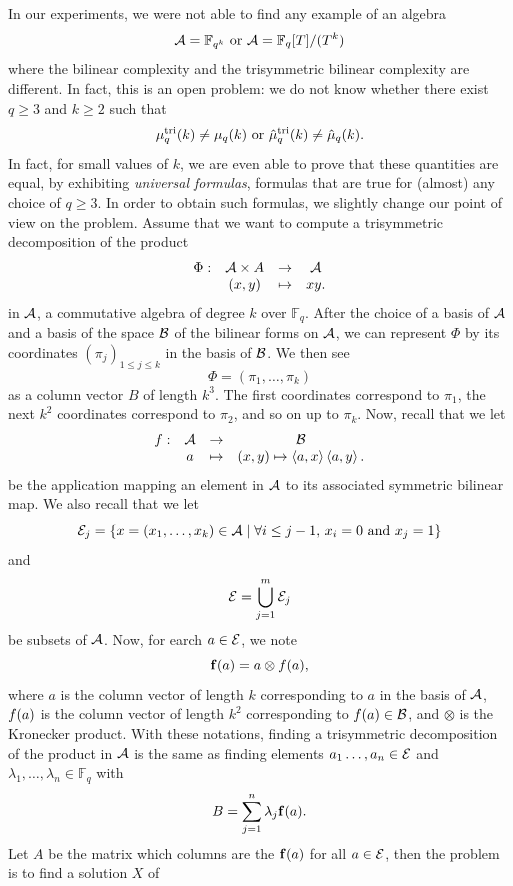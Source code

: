 In our experiments, we were not able to find any example of an algebra
\[
  \mathcal{A} = \mathbb{F}_{q^k}\text{ or } \mathcal{A} = \mathbb{F}_{q}[T]/(T^k)
\]
where the bilinear complexity and the trisymmetric bilinear complexity are
different. In fact, this is an open problem: we do not know whether there exist
$q\geq3$ and $k\geq 2$ such that 
\[
  \mu^{\textrm{tri}}_q(k)\neq\mu_q(k)\text{ or }\hat\mu^{\textrm{tri}}_q(k)\neq\hat\mu_q(k).
\]
In fact, for small values of $k$, we are even able to prove that these
quantities are equal, by exhibiting \emph{universal formulas}, \ie formulas that
are true for (almost) any choice of $q\geq3$. In order to obtain such formulas,
we slightly change our point of view on the problem. Assume that we want to
compute a trisymmetric decomposition of the product
\[
  \begin{array}{cccc}
    \Phi: & \mathcal{A}\times A & \to & \mathcal{A}\\
    & (x,y) & \mapsto & xy.
  \end{array}
\]
in $\mathcal{A}$, a commutative algebra of degree $k$ over $\mathbb{F}_q$. After the
choice of a basis of $\mathcal{A}$ and a basis of the space $\mathcal{B}$ of the bilinear forms on
$\mathcal{A}$, we can represent $\Phi$ by its coordinates $(\pi_j)_{1\leq j\leq k}$ in
the basis of $\mathcal{B}$. We then see
\[
  \Phi = (\pi_1, \dots, \pi_k)
\]
as a column vector $B$ of length $k^3$. The first coordinates correspond to
$\pi_1$, the next $k^2$ coordinates correspond to $\pi_2$, and so on up to
$\pi_k$. Now, recall that we let 
\[
  \begin{array}{cccc}
    f: & \mathcal{A} & \to & \mathcal{B}\\
    & a & \mapsto & (x, y)\mapsto\left\langle a,x\right\rangle\left\langle a,y\right\rangle.
  \end{array}
\]
be the application mapping an element in $\mathcal{A}$ to its associated symmetric
bilinear map. We also recall that we let 
\[
  \mathcal{E}_j=\left\{ x=(x_1, \dots, x_k)\in
    \mathcal{A}\mid \forall i\leq j-1,\,x_i=0\text{ and }x_j=1 \right\}
\]
and
\[
  \mathcal{E} = \bigcup_{j=1}^m\mathcal{E}_j
\]
be subsets of $\mathcal{A}$. Now, for earch $a\in \mathcal{E}$, we note
\[
  \mathbf{f}(a) = a\otimes f(a),
\]
where $a$ is the column vector of length $k$ corresponding to $a$ in the basis
of $\mathcal{A}$, $f(a)$ is the column vector of length $k^2$ corresponding
to $f(a)\in\mathcal{B}$, and $\otimes$ is the Kronecker product. With these notations,
finding a trisymmetric decomposition of the product in
$\mathcal{A}$ is the same as finding elements $a_1\dots,
a_n\in\mathcal{E}$ and $\lambda_1, \dots, \lambda_n\in\mathbb{F}_q$ with
\[
  B = \sum_{j=1}^n \lambda_j\mathbf{f}(a).
\]
Let $A$ be the matrix which columns are the $\mathbf{f}(a)$ for all $a\in\mathcal{E}$, then the
problem is to find a solution $X$ of
